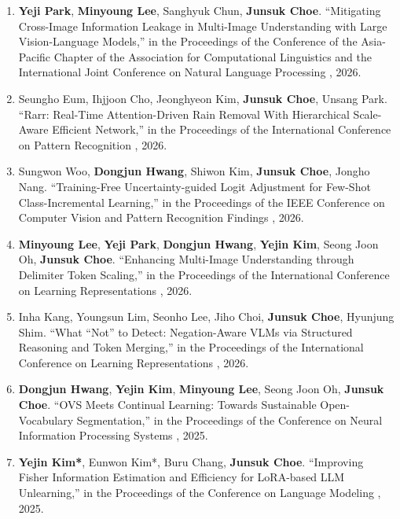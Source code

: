 \documentclass[letterpaper,11pt]{article}
\begin{document}
\begin{enumerate}[itemsep=5.5pt]

    \item \textbf{Yeji Park}, \textbf{Minyoung Lee}, Sanghyuk Chun, \textbf{Junsuk Choe}.
    ``Mitigating Cross-Image Information Leakage in Multi-Image Understanding with Large Vision-Language Models,''
    in the Proceedings of the Conference of the Asia-Pacific Chapter of the Association for Computational Linguistics and the International Joint Conference on Natural Language Processing , 2026.

    \item Seungho Eum, Ihjjoon Cho, Jeonghyeon Kim, \textbf{Junsuk Choe\textdagger}, Unsang Park\textdagger.
    ``Rarr: Real-Time Attention-Driven Rain Removal With Hierarchical Scale-Aware Efficient Network,''
    in the Proceedings of the International Conference on Pattern Recognition , 2026.

    \item Sungwon Woo, \textbf{Dongjun Hwang}, Shiwon Kim, \textbf{Junsuk Choe}, Jongho Nang.
    ``Training-Free Uncertainty-guided Logit Adjustment for Few-Shot Class-Incremental Learning,''
    in the Proceedings of the IEEE Conference on Computer Vision and Pattern Recognition Findings , 2026.

    \item \textbf{Minyoung Lee}, \textbf{Yeji Park}, \textbf{Dongjun Hwang}, \textbf{Yejin Kim}, Seong Joon Oh, \textbf{Junsuk Choe}.
    ``Enhancing Multi-Image Understanding through Delimiter Token Scaling,''
    in the Proceedings of the International Conference on Learning Representations , 2026.

    \item Inha Kang, Youngsun Lim, Seonho Lee, Jiho Choi, \textbf{Junsuk Choe}, Hyunjung Shim.
    ``What ``Not'' to Detect: Negation-Aware VLMs via Structured Reasoning and Token Merging,''
    in the Proceedings of the International Conference on Learning Representations , 2026.

    \item \textbf{Dongjun Hwang}, \textbf{Yejin Kim}, \textbf{Minyoung Lee}, Seong Joon Oh, \textbf{Junsuk Choe}.
    ``OVS Meets Continual Learning: Towards Sustainable Open-Vocabulary Segmentation,''
    in the Proceedings of the Conference on Neural Information Processing Systems , 2025.

    \item \textbf{Yejin Kim*}, Eunwon Kim*, Buru Chang\textdagger, \textbf{Junsuk Choe\textdagger}.
    ``Improving Fisher Information Estimation and Efficiency for LoRA-based LLM Unlearning,''
    in the Proceedings of the Conference on Language Modeling , 2025.


\end{enumerate}
\end{document}
